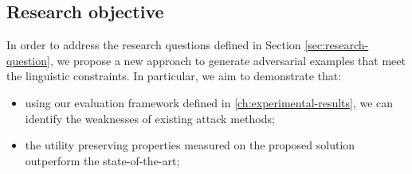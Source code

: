 
\subsection{Research objective}\label{subsec:research-objective}

In order to address the research questions defined in Section \ref{sec:research-question}, 
we propose a new approach to generate adversarial examples that meet the linguistic constraints.
In particular, we aim to demonstrate that:
\begin{itemize}
    \item using our evaluation framework defined in \ref{ch:experimental-results}, we can identify the weaknesses of existing attack methods;
    \item the utility preserving properties measured on the proposed solution outperform the state-of-the-art;
\end{itemize}
 

